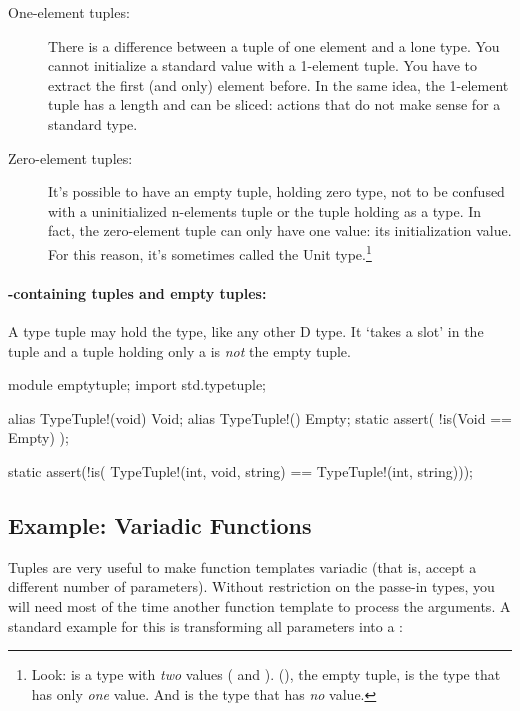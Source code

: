 \begin{description}
\item[One-element tuples:] There is a difference between a tuple of one element and a lone type. You cannot initialize a standard value with a 1-element tuple. You have to extract the first (and only) element before. In the same idea, the 1-element tuple has a length and can be sliced: actions that do not make sense for a standard type.
\item[Zero-element tuples:] It's possible to have an empty tuple, holding zero type, not to be confused with a uninitialized n-elements tuple or the tuple holding  as a type. In fact, the zero-element tuple can only have one value: its initialization value. For this reason, it's sometimes called the Unit type.\footnote{ Look:  is a type with \emph{two} values ( and ). (), the empty tuple, is the type that has only \emph{one} value. And  is the type that has \emph{no} value.}
\end{description}

\paragraph{-containing tuples and empty tuples: } A type tuple may hold the  type, like any other D type. It `takes a slot' in the tuple and a tuple holding only a  is \emph{not} the empty tuple.

\begin{dcode}
module emptytuple;
import std.typetuple;

alias TypeTuple!(void) Void;
alias TypeTuple!() Empty;
static assert( !is(Void == Empty) );

static assert(!is( TypeTuple!(int, void, string) == TypeTuple!(int, string)));
\end{dcode}

\subsection{Example: Variadic Functions}\label{variadicfunctions}

Tuples are very useful to make function templates variadic (that is, accept a different number of parameters). Without restriction on the passe-in types, you will need most of the time another function template to process the arguments. A standard example for this is transforming all parameters into a :

